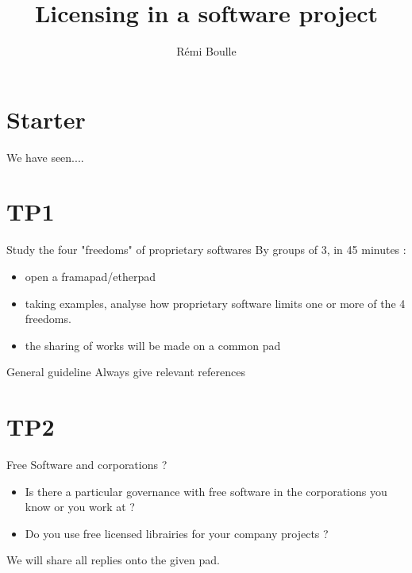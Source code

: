 \documentclass{beamer}
\title[]{Licensing in a software project}
\author{Rémi Boulle}}
\date{}
\institute{}
\begin{document}


\begin{frame}
  \titlepage
\end{frame}

\section{Starter}

\begin{frame}
  We have seen....
\end{frame}

\section{TP1}

\begin{frame}{Study the four "freedoms" of proprietary softwares}
  By groups of 3, in 45 minutes :
  \begin{itemize}
  \item open a framapad/etherpad
  \item taking examples, analyse how proprietary software limits one or more of the 4 freedoms.
  \item the sharing of works will be made on a common pad
  \end{itemize}

  \begin{alertblock}{General guideline}
	Always give relevant references 
  \end{alertblock}
\end{frame}

\section{TP2}

\begin{frame}{Free Software and corporations ?}

  \begin{itemize}
  \item Is there a particular governance with free software in the corporations you know or you work at ?
  \item Do you use free licensed librairies for your company projects ? 
  \end{itemize}

We will share all replies onto the given pad.  
\end{frame}
\end{document}
